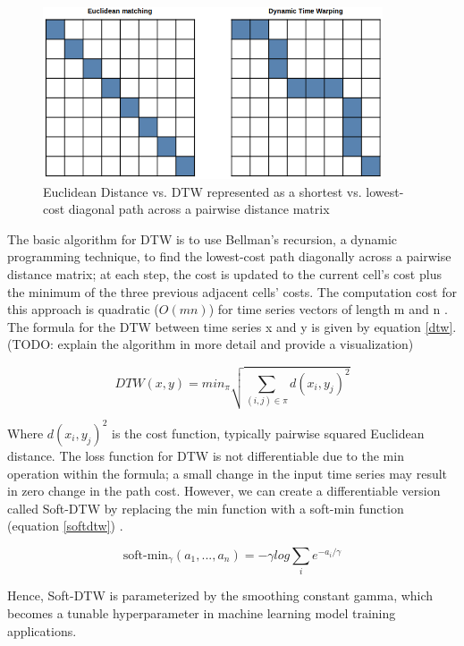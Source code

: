 \documentclass[12pt, letterpaper]{article}
\begin{document}
\begin{figure}[htbp]
\includegraphics[height=2in]{img/euclidean_dtw_matrix.png}
\centering
\caption{Euclidean Distance vs. DTW represented as a shortest
  vs. lowest-cost diagonal path across a pairwise distance matrix}
\label{euclidean_matrix}
\end{figure}

The basic algorithm for DTW is to use Bellman’s recursion, a dynamic programming
technique, to find the lowest-cost path diagonally across a pairwise distance
matrix; at each step, the cost is updated to the current cell's cost plus the
minimum of the three previous adjacent cells' costs. The computation cost for
this approach is quadratic ($O(mn)$) for time series vectors of length m and n
\cite{cuturi_soft-dtw_2018}. The formula for the DTW between time series x and y
is given by equation \ref{dtw}.  (TODO: explain the algorithm in more detail and
provide a visualization)

\begin{equation} \label{dtw}
DTW(x,y) = min_{\pi}\sqrt{\sum_{(i,j)\in\pi}d(x_{i},y_{j})^2}
\end{equation}

Where $d(x_i,y_j)^2$ is the cost function, typically pairwise squared Euclidean
distance. The loss function for DTW is not differentiable due to the min
operation within the formula; a small change in the input time series may result
in zero change in the path cost. However, we can create a differentiable version
called Soft-DTW by replacing the min function with a soft-min function
(equation \ref{softdtw}) \cite{cuturi_soft-dtw_2018}.

\begin{equation} \label{softdtw}
\text{soft-min}_\gamma(a_1,...,a_n) = -\gamma log\sum_{i}e^{-a_i/\gamma}
\end{equation}

Hence, Soft-DTW is parameterized by the smoothing constant gamma, which becomes
a tunable hyperparameter in machine learning model training applications.
\end{document}
